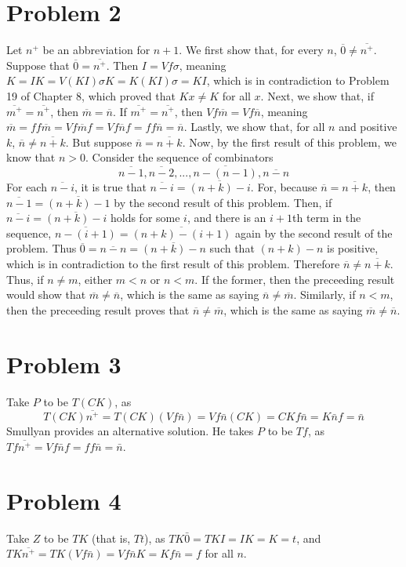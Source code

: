 \documentclass{article}
\theoremstyle{definition}
\begin{document}
\section*{Problem 2}
Let $n^+$ be an abbreviation for $n+1$. We first show that, for every $n$, $\overline{0}\ne\overline{n^+}$. Suppose that $\overline{0}=\overline{n^+}$. Then 
$I=Vf\sigma$, meaning $K=IK=V(KI)\sigma K=K(KI)\sigma=KI$, which is in contradiction to Problem 19 of Chapter 8, which proved that $Kx\ne K$ for all $x$. Next, we show that, 
if $\overline{m^+}=\overline{n^+}$, then $\overline{m}=\overline{n}$. If $\overline{m^+}=\overline{n^+}$, then $Vf\overline{m}=Vf\overline{n}$, meaning 
$\overline{m}=ff\overline{m}=Vf\overline{m}f=Vf\overline{n}f=ff\overline{n}=\overline{n}$. Lastly, we show that, for all $n$ and positive $k$, $\overline{n}\ne\overline{n+k}$. But suppose 
$\overline{n}=\overline{n+k}$. Now, by the first result of this problem, we know that $n>0$. Consider the sequence of combinators
\[ \overline{n-1},\overline{n-2},...,\overline{n-(n-1)},\overline{n-n} \] For each $\overline{n-i}$, it is true that $\overline{n-i}=\overline{(n+k)-i}$. For, because $\overline{n}=\overline{n+k}$, then 
$\overline{n-1}=\overline{(n+k)-1}$ by the second result of this problem. Then, if $\overline{n-i}=\overline{(n+k)-i}$ holds for some $i$, and there is an $i+1$th term in the sequence, 
$\overline{n-(i+1)}=\overline{(n+k)-(i+1)}$ again by the second result of the problem. Thus $\overline{0}=\overline{n-n}=\overline{(n+k)-n}$ such that $(n+k)-n$ is positive, which is in contradiction to the first result 
of this problem. Therefore $\overline{n}\ne\overline{n+k}$. Thus, if $n\ne m$, either $m<n$ or $n<m$. If the former, then the preceeding result would show that 
$\overline{m}\ne\overline{n}$, which is the same as saying $\overline{n}\ne\overline{m}$. Similarly, if $n<m$, then the preceeding result proves that $\overline{n}\ne\overline{m}$, which is the same as saying 
$\overline{m}\ne\overline{n}$.

\section*{Problem 3}
Take $P$ to be $T(CK)$, as \[ T(CK)\overline{n^+}=T(CK)(Vf\bar{n})=Vf\bar{n}(CK)=CKf\bar{n}=K\bar{n}f=\bar{n} \] Smullyan provides an alternative solution. He takes $P$ to be $Tf$, as 
$Tf\overline{n^+}=Vf\bar{n}f=ff\bar{n}=\bar{n}$.

\section*{Problem 4}
Take $Z$ to be $TK$ (that is, $Tt$), as $TK\bar{0}=TKI=IK=K=t$, and $TK\overline{n^+}=TK(Vf\bar{n})=Vf\bar{n}K=Kf\bar{n}=f$ for all $n$.
\end{document}
